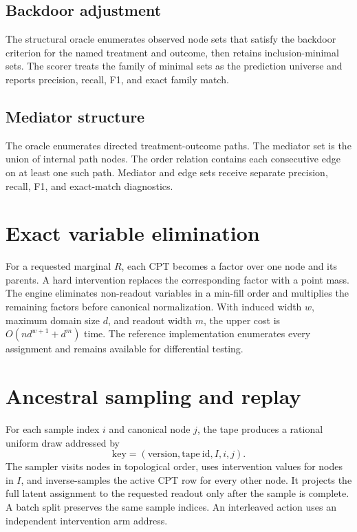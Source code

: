 \documentclass{article}
\begin{document}
\subsection{Backdoor adjustment}

The structural oracle enumerates observed node sets that satisfy the backdoor
criterion for the named treatment and outcome, then retains inclusion-minimal
sets. The scorer treats the family of minimal sets as the prediction universe and
reports precision, recall, F1, and exact family match.

\subsection{Mediator structure}

The oracle enumerates directed treatment-outcome paths. The mediator set is the
union of internal path nodes. The order relation contains each consecutive edge
on at least one such path. Mediator and edge sets receive separate precision,
recall, F1, and exact-match diagnostics.

\section{Exact variable elimination}

For a requested marginal $R$, each CPT becomes a factor over one node and its
parents. A hard intervention replaces the corresponding factor with a point mass.
The engine eliminates non-readout variables in a min-fill order and multiplies the
remaining factors before canonical normalization. With induced width $w$, maximum
domain size $d$, and readout width $m$, the upper cost is
$O(nd^{w+1}+d^m)$ time. The reference implementation enumerates every assignment
and remains available for differential testing.

\section{Ancestral sampling and replay}

For each sample index $i$ and canonical node $j$, the tape produces a rational
uniform draw addressed by
\begin{equation}
  \mathrm{key}=(\mathrm{version},\mathrm{tape\ id},I,i,j).
\end{equation}
The sampler visits nodes in topological order, uses intervention values for nodes
in $I$, and inverse-samples the active CPT row for every other node. It projects
the full latent assignment to the requested readout only after the sample is
complete. A batch split preserves the same sample indices. An interleaved action
uses an independent intervention arm address.
\end{document}
